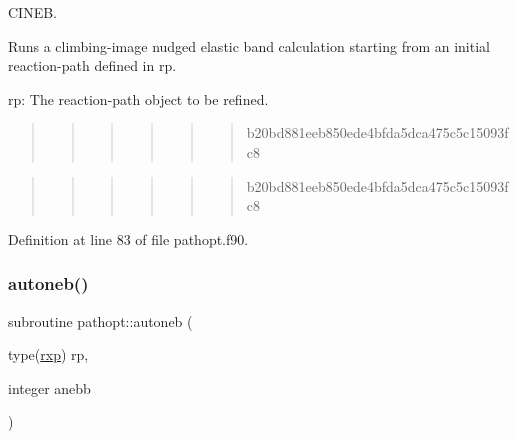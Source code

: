 C\+I\+N\+EB. 

Runs a climbing-\/image nudged elastic band calculation starting from an initial reaction-\/path defined in rp.


\begin{DoxyItemize}
\item rp\+: The reaction-\/path object to be refined. 
\end{DoxyItemize}\begin{quote}
\begin{quote}
\begin{quote}
\begin{quote}
\begin{quote}
\begin{quote}
b20bd881eeb850ede4bfda5dca475c5c15093fc8 \end{quote}
\end{quote}
\end{quote}
\end{quote}
\end{quote}
\end{quote}


\begin{quote}
\begin{quote}
\begin{quote}
\begin{quote}
\begin{quote}
\begin{quote}
b20bd881eeb850ede4bfda5dca475c5c15093fc8 \end{quote}
\end{quote}
\end{quote}
\end{quote}
\end{quote}
\end{quote}


Definition at line 83 of file pathopt.\+f90.

\mbox{\label{namespacepathopt_af71f2239ddd07da673b810e0abe893d3}} 
\subsubsection{\texorpdfstring{autoneb()}{autoneb()}}
{\footnotesize\ttfamily subroutine pathopt\+::autoneb (\begin{DoxyParamCaption}\item[{type(\mbox{\hyperlink{structrpath_1_1rxp}{rxp}})}]{rp,  }\item[{integer}]{anebb }\end{DoxyParamCaption})}



